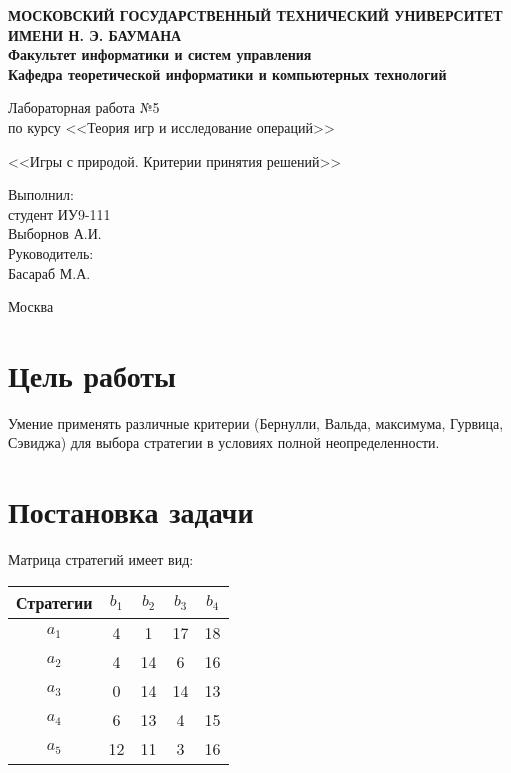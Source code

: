 \documentclass[12pt,a4paper,oneside]{extarticle}
\begin{document}
\pgfplotsset{compat=1.8}

\thispagestyle{empty}
\newpage
{
\centering


\textbf{
МОСКОВСКИЙ ГОСУДАРСТВЕННЫЙ ТЕХНИЧЕСКИЙ УНИВЕРСИТЕТ ИМЕНИ Н. Э. БАУМАНА \\
Факультет информатики и систем управления \\
Кафедра теоретической информатики и компьютерных технологий}
\bigskip
\bigskip
\bigskip
\bigskip
\bigskip
\bigskip
\bigskip

\vfill


Лабораторная работа №5 \\
по курсу <<Теория игр и исследование операций>>

\bigskip

{\large <<Игры с природой. Критерии принятия решений>>}
\bigskip

\vfill



\hfill\parbox{4cm} {
Выполнил:\\
студент ИУ9-111 \hfill \\
Выборнов А.И.\hfill \medskip\\
Руководитель:\\
Басараб М.А.\hfill
}


\vspace{\fill}

Москва \number\year
\clearpage
}



\clearpage

\section{Цель работы}
    Умение применять различные критерии (Бернулли, Вальда, максимума, Гурвица,
Сэвиджа) для выбора стратегии в условиях полной неопределенности.

\section{Постановка задачи}
    Матрица стратегий имеет вид:

    \begin{center}
        \begin{tabular}{|c|c|c|c|c|}
            \hline
            Стратегии & $b_1$ & $b_2$ & $b_3$ & $b_4$ \\ \hline
            $a_1$     & 4     & 1     & 17    & 18    \\ \hline 
            $a_2$     & 4     & 14    & 6     & 16    \\ \hline 
            $a_3$     & 0     & 14    & 14    & 13    \\ \hline 
            $a_4$     & 6     & 13    & 4     & 15    \\ \hline 
            $a_5$     & 12    & 11    & 3     & 16    \\ \hline 
        \end{tabular}
    \end{center}
\end{document}
